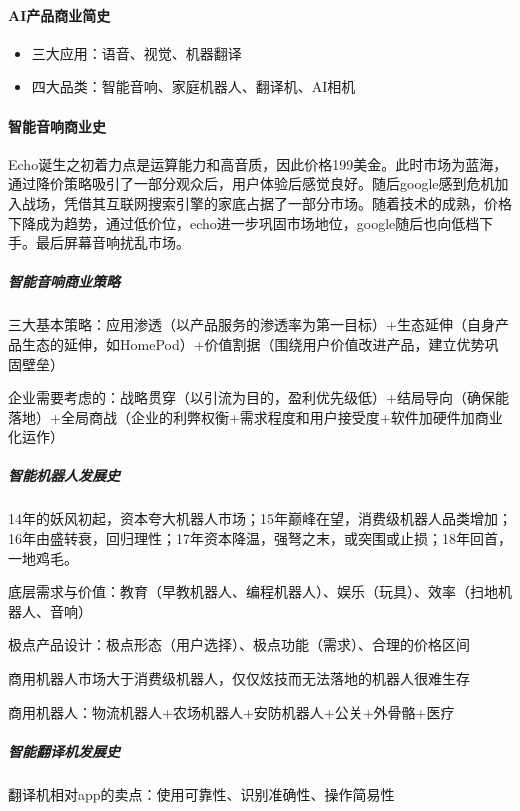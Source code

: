 \documentclass[letterpaper,11pt,english]{sphinxmanual}
\begin{document}
\paragraph{AI产品商业简史}
\label{\detokenize{chapter_project/AI_hardware:ai}}\begin{itemize}
\item {} 
三大应用：语音、视觉、机器翻译

\item {} 
四大品类：智能音响、家庭机器人、翻译机、AI相机

\end{itemize}


\paragraph{智能音响商业史}
\label{\detokenize{chapter_project/AI_hardware:id8}}
Echo诞生之初着力点是运算能力和高音质，因此价格199美金。此时市场为蓝海，通过降价策略吸引了一部分观众后，用户体验后感觉良好。随后google感到危机加入战场，凭借其互联网搜索引擎的家底占据了一部分市场。随着技术的成熟，价格下降成为趋势，通过低价位，echo进一步巩固市场地位，google随后也向低档下手。最后屏幕音响扰乱市场。


\subparagraph{智能音响商业策略}
\label{\detokenize{chapter_project/AI_hardware:id9}}
三大基本策略：应用渗透（以产品服务的渗透率为第一目标）+生态延伸（自身产品生态的延伸，如HomePod）+价值割据（围绕用户价值改进产品，建立优势巩固壁垒）

企业需要考虑的：战略贯穿（以引流为目的，盈利优先级低）+结局导向（确保能落地）+全局商战（企业的利弊权衡+需求程度和用户接受度+软件加硬件加商业化运作）


\subparagraph{智能机器人发展史}
\label{\detokenize{chapter_project/AI_hardware:id10}}
14年的妖风初起，资本夸大机器人市场；15年巅峰在望，消费级机器人品类增加；16年由盛转衰，回归理性；17年资本降温，强弩之末，或突围或止损；18年回首，一地鸡毛。

底层需求与价值：教育（早教机器人、编程机器人）、娱乐（玩具）、效率（扫地机器人、音响）

极点产品设计：极点形态（用户选择）、极点功能（需求）、合理的价格区间

商用机器人市场大于消费级机器人，仅仅炫技而无法落地的机器人很难生存

商用机器人：物流机器人+农场机器人+安防机器人+公关+外骨骼+医疗


\subparagraph{智能翻译机发展史}
\label{\detokenize{chapter_project/AI_hardware:id11}}
翻译机相对app的卖点：使用可靠性、识别准确性、操作简易性
\end{document}
